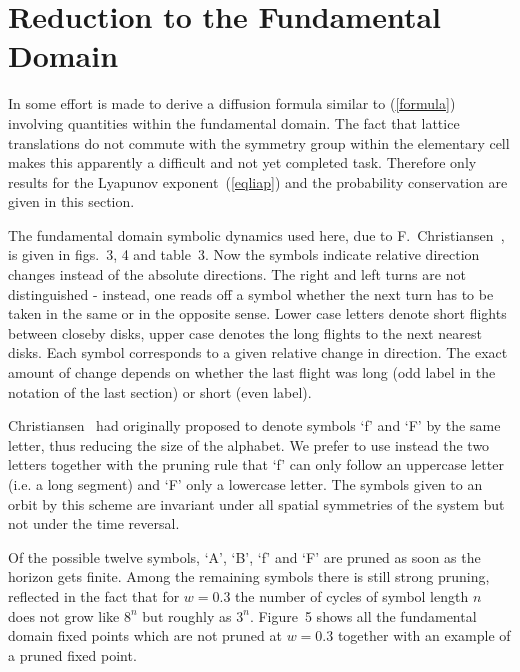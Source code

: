 \section{Reduction to the Fundamental Domain}
In \cite{CEG} some effort is made to derive a diffusion formula similar to
(\ref{formula}) involving quantities within the fundamental domain. The
fact that lattice translations do not commute with the symmetry group within
the elementary cell makes this apparently a difficult and
not yet completed task.
Therefore only results for the Lyapunov exponent~(\ref{eqliap}) and the
probability conservation are given in this section.

The fundamental domain
symbolic dynamics used here, due to
F.~Christiansen~\cite{freddy}, is
given in figs.~3, 4 and table~3.
Now the symbols indicate relative direction changes
instead of the absolute directions.
The right and left turns are not distinguished - instead,  one reads
off a symbol whether the next
turn has to be taken in the same or in the opposite sense.
%
Lower case letters denote short flights between closeby disks, upper case
denotes the long flights to the next nearest disks.
Each symbol corresponds to a given relative change
in direction. The exact amount of
change depends on whether the last flight was
long (odd label in the notation of the last section) or short (even label).

Christiansen~\cite{freddy} had
originally proposed to denote symbols `f' and `F' by the same
letter, thus reducing the size of the alphabet.
We prefer to use instead the
two letters together with the
pruning rule that `f' can only follow an uppercase
letter (i.e. a long segment) and `F' only a lowercase letter.
The symbols given to an orbit by this scheme are invariant under all spatial
symmetries of the system but not under the time reversal.

Of the possible twelve symbols,  `A', `B', `f' and `F'
are pruned as soon as the horizon gets finite.
Among the remaining symbols there is
still strong pruning,  reflected in the fact that
for $w = 0.3$ the
number of cycles of symbol length $n$
does not grow like $8^n$ but roughly as
$3^n$. Figure~5 shows all the fundamental domain fixed
points which are not pruned at $w=0.3$ together with an example
of a pruned fixed point.


